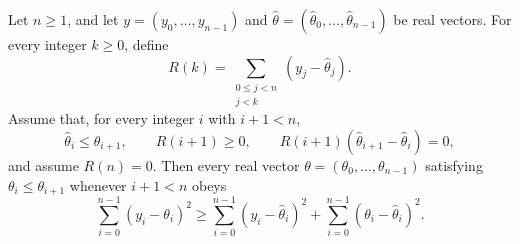 \begin{theorem}
Let $n\geq1$, and let $y=(y_0,\ldots,y_{n-1})$ and
$\widehat\theta=(\widehat\theta_0,\ldots,\widehat\theta_{n-1})$ be real
vectors.  For every integer $k\geq0$, define
\[
  R(k)=\sum_{\substack{0\leq j<n\\j<k}}(y_j-\widehat\theta_j).
\]
Assume that, for every integer $i$ with $i+1<n$,
\[
  \widehat\theta_i\leq\widehat\theta_{i+1},
  \qquad R(i+1)\geq0,
  \qquad
  R(i+1)(\widehat\theta_{i+1}-\widehat\theta_i)=0,
\]
and assume $R(n)=0$.  Then every real vector
$\theta=(\theta_0,\ldots,\theta_{n-1})$ satisfying
$\theta_i\leq\theta_{i+1}$ whenever $i+1<n$ obeys
\[
  \sum_{i=0}^{n-1}(y_i-\theta_i)^2
  \geq
  \sum_{i=0}^{n-1}(y_i-\widehat\theta_i)^2
  +\sum_{i=0}^{n-1}(\theta_i-\widehat\theta_i)^2.
\]
\end{theorem}
